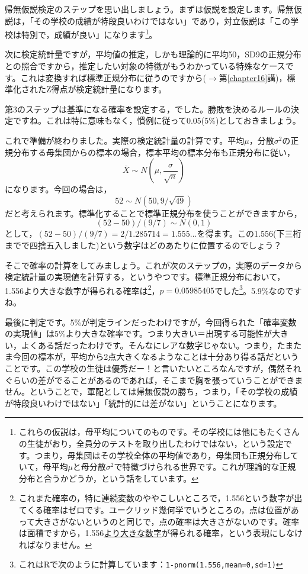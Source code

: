 \documentclass{ltjsarticle}
\begin{document}
帰無仮説検定のステップを思い出しましょう。まずは仮説を設定します。帰無仮説は，「その学校の成績が特段良いわけではない」であり，対立仮説は「この学校は特別で，成績が良い」になります\footnote{これらの仮説は，母平均についてのものです。その学校には他にもたくさんの生徒がおり，全員分のテストを取り出したわけではない，という設定です。つまり，母集団はその学校全体の平均値であり，母集団も正規分布していて，母平均$\mu$と母分散$\sigma^2$で特徴づけられる世界です。これが理論的な正規分布と合うかどうか，という話をしています。}。

次に検定統計量ですが，平均値の推定，しかも理論的に平均50，SD9の正規分布との照合ですから，推定したい対象の特徴がもうわかっている特殊なケースです。これは変換すれば標準正規分布に従うのですから($\to$第\ref{chapter16}講)，標準化されたZ得点が検定統計量になります。

第3のステップは基準になる確率を設定する，でした。勝敗を決めるルールの決定ですね。これは特に意味もなく，慣例に従って0.05(5\%)としておきましょう。

これで準備が終わりました。実際の検定統計量の計算です。平均$\mu$，分散$\sigma^2$の正規分布する母集団からの標本の場合，標本平均の標本分布も正規分布に従い，
\[ \bar{X} \sim N(\mu,\frac{\sigma}{\sqrt{n}}) \]
になります。今回の場合は，
\[ 52 \sim N(50,9/\sqrt{49}) \]
だと考えられます。標準化することで標準正規分布を使うことができますから，
\[ (52-50)/(9/7) \sim N(0,1) \]
として，$ (52-50)/(9/7) =2/1.285714=1.555... $を得ます。この1.556(下三桁までで四捨五入しました)という数字はどのあたりに位置するのでしょう？ 

そこで確率の計算をしてみましょう。これが次のステップの，実際のデータから検定統計量の実現値を計算する，というやつです。標準正規分布において，1.556より大きな数字が得られる確率は\footnote{これまた確率の，特に連続変数のややこしいところで，1.556という数字が出てくる確率はゼロです。ユークリッド幾何学でいうところの，点は位置があって大きさがないというのと同じで，点の確率は大きさがないのです。確率は面積ですから，1.556\underline{より大きな数字}が得られる確率，という表現にしなければなりません。}，$p=0.05985405$でした\footnote{これはRで次のように計算しています：\texttt{1-pnorm(1.556,mean=0,sd=1)}}。5.9\%なのですね。

最後に判定です。5\%が判定ラインだったわけですが，今回得られた「確率変数の実現値」は5\%より大きな確率です。つまり大きい＝出現する可能性が大きい，よくある話だったわけです。そんなにレアな数字じゃない。つまり，たまたま今回の標本が，平均から2点大きくなるようなことは十分あり得る話だということです。この学校の生徒は優秀だー！と言いたいところなんですが，偶然それぐらいの差がでることがあるのであれば，そこまで胸を張っていうことができません。ということで，軍配としては帰無仮説の勝ち，つまり，「その学校の成績が特段良いわけではない」「統計的には差がない」ということになります。
\end{document}
